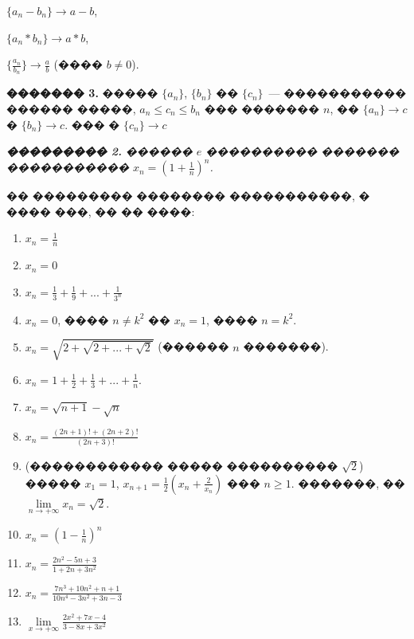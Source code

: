 \documentclass[a4paper,12pt]{article}
\begin{document}
$\{a_{n}-b_{n}\}\rightarrow a-b$,

$\{a_{n}*b_{n}\}\rightarrow a*b$,

$\{\frac{a_{n}}{b_{n}}\}\rightarrow \frac{a}{b}$ (���� $b\neq 0$).

\textbf{������� 3.} ����� $\{a_{n}\}$, $\{b_{n}\}$ �� $\{c_{n}\}$~--- ����������� ������ �����, $a_{n}\leq c_{n}\leq b_{n}$ ��� ������� $n$, �� $\{a_{n}\}\rightarrow c$ � $\{b_{n}\}\rightarrow c$. ��� � $\{c_{n}\}\rightarrow c$

\textit{\textbf{��������� 2.}} \textit{������ $e$ ���������� ������� ����������� $x_{n}=(1+\frac{1}{n})^{n}$.}

\medskip\medskip\medskip

�� ��������� �������� �����������, � ���� ���, �� �� ����:

\begin{enumerate}
\item $x_{n}=\frac{1}{n}$

\item $x_{n}=0$

\item $x_{n}=\frac{1}{3}+\frac{1}{9}+...+\frac{1}{3^{n}}$

\item $x_{n}=0$, ���� $n\neq k^{2}$ �� $x_{n}=1$, ���� $n=k^{2}$.

\item $x_{n}=\sqrt{2+\sqrt{2+...+\sqrt{2}}}$ (������ $n$ �������).

\item $x_{n}=1+\frac{1}{2}+\frac{1}{3}+...+\frac{1}{n}$.

\item $x_{n}=\sqrt{n+1}-\sqrt{n}$

\item $x_{n}=\frac{(2n+1)!+(2n+2)!}{(2n+3)!}$

\item (������������ ����� ���������� $\sqrt{2}$) ����� $x_{1}=1$, $x_{n+1}=\frac{1}{2}(x_{n}+\frac{2}{x_{n}})$ ��� $n\geq 1$. �������, �� $\lim\limits_{n\rightarrow +\infty}^{}x_{n}=\sqrt{2}$.

\item $x_{n}=(1-\frac{1}{n})^{n}$

\item $x_{n}=\frac{2n^{2}-5n+3}{1+2n+3n^{2}}$

\item $x_{n}=\frac{7n^{3}+10n^{2}+n+1}{10n^{4}-3n^{2}+3n-3}$

\item $\lim\limits_{x\rightarrow +\infty}^{}\frac{2x^{2}+7x-4}{3-8x+3x^{2}}$


\end{enumerate}
\end{document}
